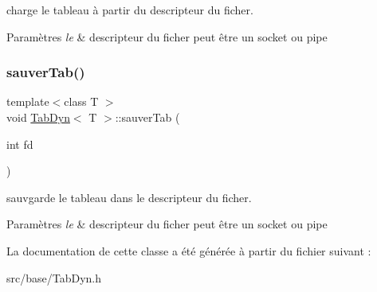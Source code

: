 charge le tableau à partir du descripteur du ficher. 


\begin{DoxyParams}{Paramètres}
{\em le} & descripteur du ficher peut être un socket ou pipe \\
\hline
\end{DoxyParams}
\mbox{\label{class_tab_dyn_acfc88ef40cb66400e9dd2ff120b5273a}} 
\subsubsection{\texorpdfstring{sauver\+Tab()}{sauverTab()}}
{\footnotesize\ttfamily template$<$class T $>$ \\
void \mbox{\hyperlink{class_tab_dyn}{Tab\+Dyn}}$<$ T $>$\+::sauver\+Tab (\begin{DoxyParamCaption}\item[{int}]{fd }\end{DoxyParamCaption})}



sauvgarde le tableau dans le descripteur du ficher. 


\begin{DoxyParams}{Paramètres}
{\em le} & descripteur du ficher peut être un socket ou pipe \\
\hline
\end{DoxyParams}


La documentation de cette classe a été générée à partir du fichier suivant \+:\begin{DoxyCompactItemize}
\item 
src/base/Tab\+Dyn.\+h\end{DoxyCompactItemize}
